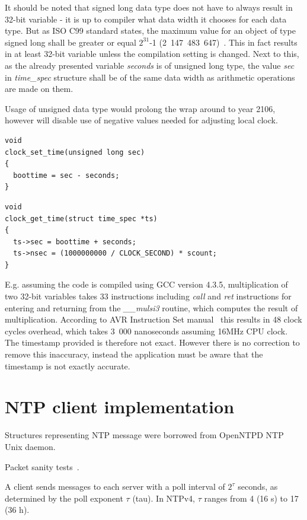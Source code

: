 It should be noted that signed long data type does not have to always result in 32-bit variable -
it is up to compiler what data width it chooses for each data type.
But as ISO C99 standard states, the maximum value for an object of type signed long
shall be greater or equal $2^{31}$-1 (2~147~483~647)~\cite{c99}.
This in fact results in at least 32-bit variable unless the compilation setting is changed.
Next to this, as the already presented variable {\it{seconds}} is of unsigned long type,
the value {\it{sec}} in {\it{time\_spec}} structure %
shall be of the same data width as arithmetic operations are made on them.

Usage of unsigned data type would prolong the wrap around to year 2106, however will disable use of negative values
needed for adjusting local clock.

\begin{lstlisting}
void
clock_set_time(unsigned long sec)
{
  boottime = sec - seconds;
}
\end{lstlisting}

\begin{lstlisting}
void
clock_get_time(struct time_spec *ts)
{
  ts->sec = boottime + seconds;
  ts->nsec = (1000000000 / CLOCK_SECOND) * scount;
}
\end{lstlisting}
E.g. assuming the code is compiled using GCC version 4.3.5,
multiplication of two 32-bit variables takes 33 instructions including {\it{call}} and {\it{ret}}
instructions for entering and returning from the {\it{\_\_mulsi3}} routine, which computes
the result of multiplication.
According to AVR Instruction Set manual~\cite{avr-instruction-set} this results in 48 clock cycles overhead,
which takes 3~000 nanoseconds assuming 16MHz CPU clock.
The timestamp provided is therefore not exact.
However there is no correction to remove this inaccuracy,
instead the application must be aware that the timestamp is not exactly accurate.


\section{NTP client implementation}
Structures representing NTP message were borrowed from OpenNTPD NTP Unix daemon.

Packet sanity tests~\cite{ntp-arch}.

A client sends messages to each server with a poll interval of $2^{\tau}$
seconds, as determined by the poll exponent $\tau$ (tau).
In NTPv4, $\tau$ ranges from 4 (16 s) to 17 (36 h).


